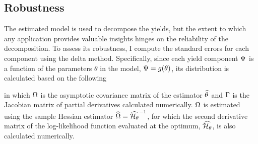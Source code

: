 {%



\subsection{Robustness}
The estimated model is used to decompose the yields, but the extent to which 
any application provides valuable insights hinges on the reliability of the decomposition.
To assess its robustness, %
I compute the standard errors for each component using the delta method.
Specifically, since each yield component \(\Psi\) is a function of the parameters \(\theta\) in the model, \(\Psi = g(\theta) \), its distribution is calculated based on the following

\noindent in which \(\Omega\) is the asymptotic covariance matrix of the estimator \(\widehat{\theta}\) and \(\Gamma\) is the Jacobian matrix of partial derivatives calculated numerically. 
\(\Omega\) is estimated using the sample Hessian estimator \(\widehat{\Omega} = \widehat{\mathcal{H}_\theta}^{-1} \), for which the second derivative matrix of the log-likelihood function evaluated at the optimum, \(\widehat{\mathcal{H}_\theta}\), is also calculated numerically.%

}
